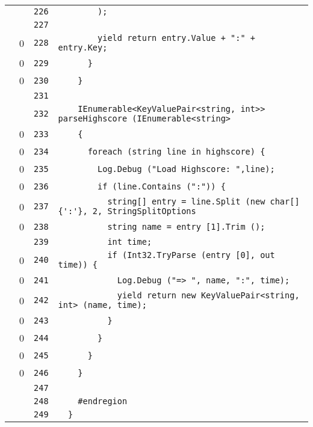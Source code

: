 \documentclass[a4paper,10pt]{article}
\begin{document}
\begin{longtable}[l]{lrrl}
\cellcolor{gray} &  & \verb~226~ & \verb~        );~\\
\cellcolor{gray} &  & \verb~227~ & \verb~~\\
\cellcolor{red} & 0 & \verb~228~ & \verb~        yield return entry.Value + ":" + entry.Key;~\\
\cellcolor{red} & 0 & \verb~229~ & \verb~      }~\\
\cellcolor{red} & 0 & \verb~230~ & \verb~    }~\\
\cellcolor{gray} &  & \verb~231~ & \verb~~\\
\cellcolor{gray} &  & \verb~232~ & \verb~    IEnumerable<KeyValuePair<string, int>> parseHighscore (IEnumerable<string>~\\
\cellcolor{red} & 0 & \verb~233~ & \verb~    {~\\
\cellcolor{red} & 0 & \verb~234~ & \verb~      foreach (string line in highscore) {~\\
\cellcolor{red} & 0 & \verb~235~ & \verb~        Log.Debug ("Load Highscore: ",line);~\\
\cellcolor{red} & 0 & \verb~236~ & \verb~        if (line.Contains (":")) {~\\
\cellcolor{red} & 0 & \verb~237~ & \verb~          string[] entry = line.Split (new char[] {':'}, 2, StringSplitOptions~\\
\cellcolor{red} & 0 & \verb~238~ & \verb~          string name = entry [1].Trim ();~\\
\cellcolor{gray} &  & \verb~239~ & \verb~          int time;~\\
\cellcolor{red} & 0 & \verb~240~ & \verb~          if (Int32.TryParse (entry [0], out time)) {~\\
\cellcolor{red} & 0 & \verb~241~ & \verb~            Log.Debug ("=> ", name, ":", time);~\\
\cellcolor{red} & 0 & \verb~242~ & \verb~            yield return new KeyValuePair<string, int> (name, time);~\\
\cellcolor{red} & 0 & \verb~243~ & \verb~          }~\\
\cellcolor{red} & 0 & \verb~244~ & \verb~        }~\\
\cellcolor{red} & 0 & \verb~245~ & \verb~      }~\\
\cellcolor{red} & 0 & \verb~246~ & \verb~    }~\\
\cellcolor{gray} &  & \verb~247~ & \verb~~\\
\cellcolor{gray} &  & \verb~248~ & \verb~    #endregion~\\
\cellcolor{gray} &  & \verb~249~ & \verb~  }~\\

\end{longtable}
\end{document}
